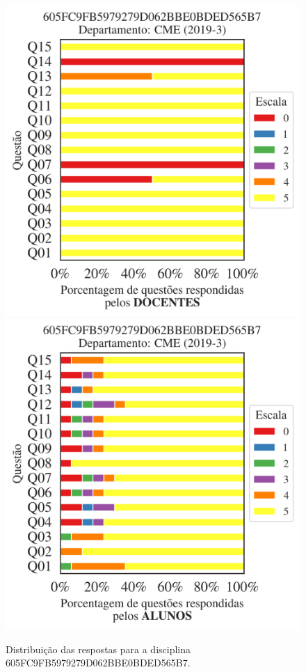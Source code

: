\documentclass[a4paper,10pt]{article}
\begin{document}
\begin{figure}[h]
\centering
\includegraphics[width=0.485\linewidth]{analise_disciplina_departamento_CME_605FC9FB5979279D062BBE0BDED565B7_docentes.png}
\includegraphics[width=0.485\linewidth]{analise_disciplina_departamento_CME_605FC9FB5979279D062BBE0BDED565B7_alunos.png}
\caption{\label{fig:analise_geral_departamento}                Distribuição das respostas para a disciplina 605FC9FB5979279D062BBE0BDED565B7. }
\end{figure}
\end{document}
